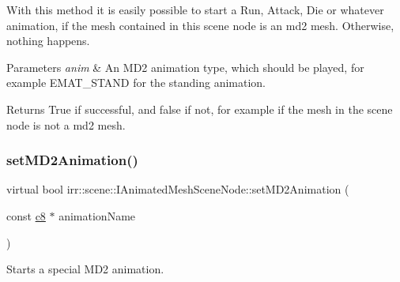 With this method it is easily possible to start a Run, Attack, Die or whatever animation, if the mesh contained in this scene node is an md2 mesh. Otherwise, nothing happens. 
\begin{DoxyParams}{Parameters}
{\em anim} & An M\+D2 animation type, which should be played, for example E\+M\+A\+T\+\_\+\+S\+T\+A\+ND for the standing animation. \\
\hline
\end{DoxyParams}
\begin{DoxyReturn}{Returns}
True if successful, and false if not, for example if the mesh in the scene node is not a md2 mesh. 
\end{DoxyReturn}
\mbox{\label{classirr_1_1scene_1_1IAnimatedMeshSceneNode_a8732866332327a7d43b91f41b5549fe3}} 
\subsubsection{\texorpdfstring{set\+M\+D2\+Animation()}{setMD2Animation()}\hspace{0.1cm}{\footnotesize\ttfamily [2/2]}}
{\footnotesize\ttfamily virtual bool irr\+::scene\+::\+I\+Animated\+Mesh\+Scene\+Node\+::set\+M\+D2\+Animation (\begin{DoxyParamCaption}\item[{const \hyperlink{namespaceirr_a9395eaea339bcb546b319e9c96bf7410}{c8} $\ast$}]{animation\+Name }\end{DoxyParamCaption})\hspace{0.3cm}{\ttfamily [pure virtual]}}



Starts a special M\+D2 animation. 

